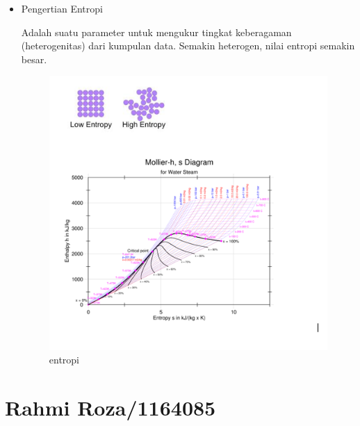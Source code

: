 \begin{enumerate}
\begin{itemize}
\par
\item Pengertian Entropi
\par Adalah suatu parameter untuk mengukur tingkat keberagaman (heterogenitas) dari kumpulan data. Semakin heterogen, nilai entropi semakin besar. 

\par

\begin{figure}[ht]
\centering
\includegraphics[scale=0.5]{figures/gambar10.PNG}
\caption{entropi}
\label{gambar10}
\end{figure}

\par
\end{itemize}

\end{enumerate}


\section{Rahmi Roza/1164085}
